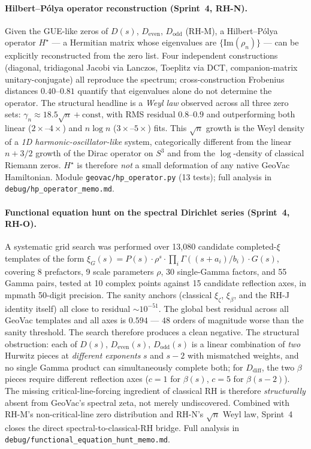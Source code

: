 \documentclass[11pt]{article}
\begin{document}
\paragraph{Hilbert--P\'olya operator reconstruction
(Sprint~4, RH-N).}  Given the GUE-like zeros of $D(s)$,
$D_{\mathrm{even}}$, $D_{\mathrm{odd}}$ (RH-M), a Hilbert--P\'olya
operator $H^\star$ --- a Hermitian matrix whose eigenvalues are
$\{\mathrm{Im}(\rho_n)\}$ --- can be explicitly reconstructed
from the zero list. Four independent constructions (diagonal,
tridiagonal Jacobi via Lanczos, Toeplitz via DCT,
companion-matrix unitary-conjugate) all reproduce the spectrum;
cross-construction Frobenius distances $0.40$--$0.81$ quantify
that eigenvalues alone do not determine the operator.  The
structural headline is a \emph{Weyl law} observed across all
three zero sets: $\gamma_n \approx 18.5 \sqrt{n} + \text{const}$,
with RMS residual $0.8$--$0.9$ and outperforming both linear
($2\times$--$4\times$) and $n\log n$ ($3\times$--$5\times$) fits.
This $\sqrt{n}$ growth is the Weyl density of a \emph{1D
harmonic-oscillator-like} system, categorically different from
the linear $n + 3/2$ growth of the Dirac operator on $S^3$ and
from the $\log$-density of classical Riemann zeros.  $H^\star$ is
therefore \emph{not} a small deformation of any native GeoVac
Hamiltonian.  Module \texttt{geovac/hp\_operator.py} (13 tests);
full analysis in \texttt{debug/hp\_operator\_memo.md}.

\paragraph{Functional equation hunt on the spectral Dirichlet
series (Sprint~4, RH-O).}  A systematic grid search was performed
over 13{,}080 candidate completed-$\xi$ templates of the form
$\xi_G(s) = P(s)\cdot \rho^s \cdot \prod_i \Gamma((s+a_i)/b_i)
\cdot G(s)$, covering 8 prefactors, 9 scale parameters $\rho$,
30 single-Gamma factors, and 55 Gamma pairs, tested at 10 complex
points against 15 candidate reflection axes, in mpmath 50-digit
precision.  The sanity anchors (classical $\xi_\zeta$, $\xi_\beta$,
and the RH-J identity itself) all close to residual $\sim 10^{-51}$.
The global best residual across all GeoVac templates and all
axes is $0.594$ --- $48$ orders of magnitude worse than the sanity
threshold.  The search therefore produces a clean negative.  The
structural obstruction: each of $D(s)$, $D_{\mathrm{even}}(s)$,
$D_{\mathrm{odd}}(s)$ is a linear combination of \emph{two}
Hurwitz pieces at \emph{different exponents} $s$ and $s-2$ with
mismatched weights, and no single Gamma product can simultaneously
complete both; for $D_{\mathrm{diff}}$, the two $\beta$ pieces
require different reflection axes ($c=1$ for $\beta(s)$,
$c=5$ for $\beta(s-2)$).  The missing critical-line-forcing
ingredient of classical RH is therefore \emph{structurally}
absent from GeoVac's spectral zeta, not merely undiscovered.
Combined with RH-M's non-critical-line zero distribution and
RH-N's $\sqrt{n}$ Weyl law, Sprint~4 closes the direct
spectral-to-classical-RH bridge.  Full analysis in
\texttt{debug/functional\_equation\_hunt\_memo.md}.
\end{document}
